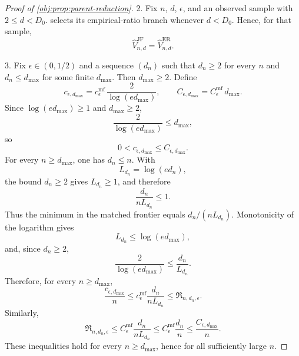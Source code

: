 \begin{proof}[Proof of \cref{obj:prop:parent-reduction}]
2. Fix \(n\), \(d\), \(\epsilon\), and an observed sample with \(2\le d<D_0\).  selects its empirical-ratio branch whenever \(d<D_0\). Hence, for that sample,
\[
\widehat V_{n,d}^{\mathrm{JF}}
=
\widehat V_{n,d}^{\mathrm{ER}} .
\]

3. Fix \(\epsilon\in(0,1/2)\) and a sequence \((d_n)\) such that \(d_n\ge2\) for every \(n\) and
\(d_n\le d_{\max}\) for some finite \(d_{\max}\). Then \(d_{\max}\ge2\). Define
\[
c_{\epsilon,d_{\max}}
=
c_\epsilon^{\mathrm{mf}}\,\frac{2}{\log(ed_{\max})},
\qquad
C_{\epsilon,d_{\max}}
=
C_\epsilon^{\mathrm{mf}}\,d_{\max}.
\]
Since \(\log(ed_{\max})\ge1\) and \(d_{\max}\ge2\),
\[
\frac{2}{\log(ed_{\max})}\le d_{\max},
\]
so
\[
0<c_{\epsilon,d_{\max}}\le C_{\epsilon,d_{\max}}.
\]
For every \(n\ge d_{\max}\), one has \(d_n\le n\). With
\[
L_{d_n}=\log(ed_n),
\]
the bound \(d_n\ge2\) gives \(L_{d_n}\ge1\), and therefore
\[
\frac{d_n}{nL_{d_n}}\le1.
\]
Thus the minimum in the matched frontier equals \(d_n/(nL_{d_n})\). Monotonicity of the logarithm gives
\[
L_{d_n}\le \log(ed_{\max}),
\]
and, since \(d_n\ge2\),
\[
\frac{2}{\log(ed_{\max})}
\le
\frac{d_n}{L_{d_n}}.
\]
Therefore, for every \(n\ge d_{\max}\),
\[
\frac{c_{\epsilon,d_{\max}}}{n}
\le
c_\epsilon^{\mathrm{mf}}\frac{d_n}{nL_{d_n}}
\le
\mathfrak R_{n,d_n,\epsilon}.
\]
Similarly,
\[
\mathfrak R_{n,d_n,\epsilon}
\le
C_\epsilon^{\mathrm{mf}}\frac{d_n}{nL_{d_n}}
\le
C_\epsilon^{\mathrm{mf}}\frac{d_n}{n}
\le
\frac{C_{\epsilon,d_{\max}}}{n}.
\]
These inequalities hold for every \(n\ge d_{\max}\), hence for all sufficiently large \(n\). %
\end{proof}
